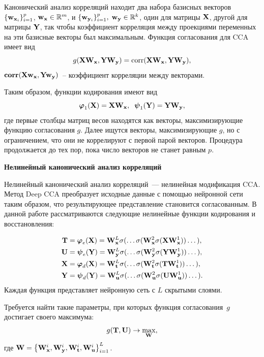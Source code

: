 Канонический анализ корреляций находит два набора базисных векторов $\{\mathbf{w}_{\mathbf{x}_i}\}_{i=1}^{p}$, $\mathbf{w}_{\mathbf{x}} \in \mathbb{R}^{m}$, и $\{\mathbf{w}_{\mathbf{y}_i}\}_{i=1}^{p}, \; \mathbf{w}_{\mathbf{y}} \in \mathbb{R}^{k}$, один для матрицы $\mathbf{X}$, другой для матрицы $\mathbf{Y}$, так чтобы коэффициент корреляция между проекциями переменных на эти базисные векторы был максимальным. Функция согласования для CCA имеет вид
\begin{equation*}
	g(\mathbf{X} \mathbf{W}_{\mathbf{x}}, \mathbf{Y} \mathbf{W}_{\mathbf{y}}) = \text{corr}(\mathbf{X} \mathbf{W}_{\mathbf{x}}, \mathbf{Y} \mathbf{W}_{\mathbf{y}}),
\end{equation*}
 $\textbf{corr}(\mathbf{X} \mathbf{w}_{\mathbf{x}}, \mathbf{Y} \mathbf{w}_{\mathbf{y}})$~-- коэффициент корреляции между векторами.

Таким образом, функции кодирования имеют вид
\begin{equation*}
	\boldsymbol{\varphi}_1(\mathbf{X}) = \mathbf{X} \mathbf{W}_{\mathbf{x}} , \;\;
	\boldsymbol{\psi}_1(\mathbf{Y}) = \mathbf{Y} \mathbf{W}_{\mathbf{y}},
\end{equation*}
где первые столбцы матриц весов находятся как векторы, максимизирующие функцию согласования $g$. Далее ищутся векторы, максимизирующие $g$, но с ограничением, что они не коррелируют с первой парой векторов. Процедура продолжается до тех пор, пока число векторов не станет равным $p$.

\textbf{Нелинейный канонический анализ корреляций}

Нелинейный канонический анализ корреляций~--- нелинейная модификация CCA. Метод Deep CCA преобразует исходные данные с помощью нейронной сети таким образом, что результирующее представление становится согласованным. В данной работе рассматриваются следующие нелинейные функции кодирования и восстановления:

\begin{align*}
	\mathbf{T} &= \boldsymbol{\varphi}_e(\mathbf{X}) =  \mathbf{W}_{\mathbf{x}}^L \sigma(\dots \sigma(\mathbf{W}_{\mathbf{x}}^2 \sigma(\mathbf{X} \mathbf{W}_{\mathbf{x}}^1)) \dots ), \\
	\mathbf{U} &= \boldsymbol{\psi}_e(\mathbf{Y}) =  \mathbf{W}_{\mathbf{y}}^L \sigma(\dots \sigma(\mathbf{W}_{\mathbf{y}}^2 \sigma(\mathbf{Y} \mathbf{W}_{\mathbf{y}}^1)) \dots ), \\
	\mathbf{X} &= \boldsymbol{\varphi}_d(\mathbf{X}) =  \mathbf{W}_{\mathbf{t}}^L \sigma(\dots \sigma(\mathbf{W}_{\mathbf{t}}^2 \sigma(\mathbf{T} \mathbf{W}_{\mathbf{t}}^1)) \dots ), \\
	\mathbf{Y} &= \boldsymbol{\psi}_d(\mathbf{Y}) =  \mathbf{W}_{\mathbf{u}}^L \sigma(\dots \sigma(\mathbf{W}_{\mathbf{u}}^2 \sigma(\mathbf{U} \mathbf{W}_{\mathbf{u}}^1)) \dots ).
\end{align*}
Каждая функция представляет нейронную сеть с $L$ скрытыми слоями.

Требуется найти такие параметры, при которых функция согласования~$g$ достигает своего максимума:
\begin{equation}
	g(\mathbf{T}, \mathbf{U}) \rightarrow \max_{\mathbf{W}},
	\label{concordance}
\end{equation}
где $\mathbf{W} = \bigl\{\mathbf{W}_{\mathbf{x}}^i, \mathbf{W}_{\mathbf{y}}^i, \mathbf{W}_{\mathbf{t}}^i, \mathbf{W}_{\mathbf{u}}^i\bigr\}_{i=1}^L$.

